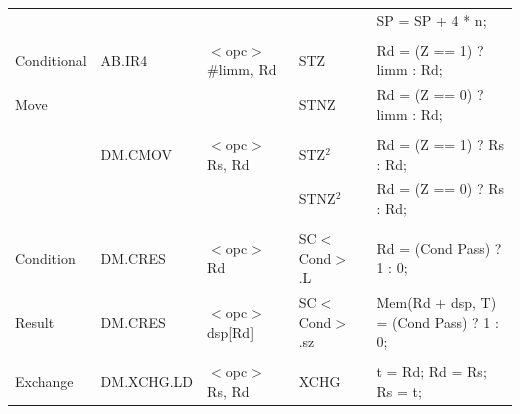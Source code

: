\begin{table}
\begin{center}
\begin{tabular}{lllll}
                   &                   &                                       &                   & SP = SP + 4 * n;                                                              \\
                   &                   &                                       &                   &                                                                               \\
Conditional        & AB.IR4            & $<$opc$>$ \#limm, Rd                  & STZ               & Rd = (Z == 1) ? limm : Rd;                                                    \\
Move               &                   &                                       & STNZ              & Rd = (Z == 0) ? limm : Rd;                                                    \\
                   &                   &                                       &                   &                                                                               \\
                   & DM.CMOV           & $<$opc$>$ Rs, Rd                      & STZ$^{2}$         & Rd = (Z == 1) ? Rs : Rd;                                                      \\
                   &                   &                                       & STNZ$^{2}$        & Rd = (Z == 0) ? Rs : Rd;                                                      \\
                   &                   &                                       &                   &                                                                               \\
Condition          & DM.CRES           & $<$opc$>$ Rd                          & SC$<$Cond$>$.L    & Rd = (Cond Pass) ? 1 : 0;                                                     \\
Result             & DM.CRES           & $<$opc$>$ dsp[Rd]                     & SC$<$Cond$>$.sz   & Mem(Rd + dsp, T) = (Cond Pass) ? 1 : 0;                                       \\
                   &                   &                                       &                   &                                                                               \\
Exchange           & DM.XCHG.LD        & $<$opc$>$ Rs, Rd                      & XCHG              & t = Rd; Rd = Rs; Rs = t;                                                      \\

\end{tabular}
\end{center}
\end{table}
